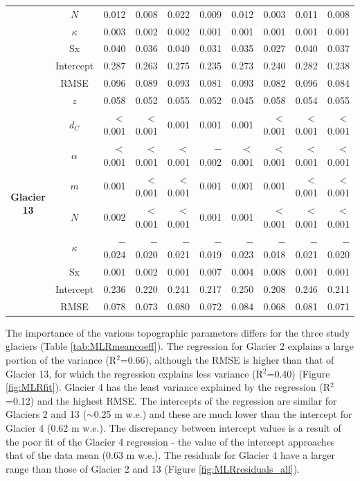 \documentclass{sfuthesis}
\begin{document}
\begin{table}
\begin{tabular}{ccrrrrrrrr}
 & $N$ & 0.012 & 0.008 & 0.022 & 0.009 & 0.012 & 0.003 & 0.011 & 0.008 \\
 & $\kappa$ & 0.003 & 0.002 & 0.002 & 0.001 & 0.001 & 0.001 & 0.001 & 0.001 \\
 & Sx & 0.040 & 0.036 & 0.040 & 0.031 & 0.035 & 0.027 & 0.040 & 0.037 \\
 & Intercept & 0.287 & 0.263 & 0.275 & 0.235 & 0.273 & 0.240 & 0.282 & 0.238 \\
 & RMSE & 0.096 & 0.089 & 0.093 & 0.081 & 0.093 & 0.082 & 0.096 & 0.084 \\ \hline
\multirow{9}{*}{\textbf{Glacier 13}} & $z$ & 0.058 & 0.052 & 0.055 & 0.052 & 0.045 & 0.058 & 0.054 & 0.055 \\
 & $d_C$ & $<$0.001 & $<$0.001 & 0.001 & 0.001 & 0.001 & $<$0.001 & $<$0.001 & $<$0.001 \\
 & $\alpha$ & $<$0.001 & $<$0.001 & $<$0.001 & $-$0.002 & $<$0.001 & $<$0.001 & $<$0.001 & $<$0.001 \\
 & $m$ & 0.001 & $<$0.001 & $<$0.001 & 0.001 & 0.001 & 0.001 & $<$0.001 & $<$0.001 \\
 & $N$ & 0.002 & $<$0.001 & $<$0.001 & 0.001 & 0.001 & $<$0.001 & $<$0.001 & $<$0.001 \\
 & $\kappa$ & $-$0.024 & $-$0.020 & $-$0.021 & $-$0.019 & $-$0.023 & $-$0.018 & $-$0.021 & $-$0.020 \\
 & Sx & 0.001 & 0.002 & 0.001 & 0.007 & 0.004 & 0.008 & 0.001 & 0.001 \\
 & Intercept & 0.236 & 0.220 & 0.241 & 0.217 & 0.250 & 0.208 & 0.246 & 0.211 \\
 & RMSE & 0.078 & 0.073 & 0.080 & 0.072 & 0.084 & 0.068 & 0.081 & 0.071
\end{tabular}
\end{table}

The importance of the various topographic parameters differs for the three study glaciers (Table \ref{tab:MLRmeancoeff}). The regression for Glacier 2 explains a large portion of the variance (R$^2$=0.66), although the RMSE is higher than that of Glacier 13, for which the regression explains less variance (R$^2$=0.40) (Figure \ref{fig:MLRfit}). Glacier 4 has the least variance explained by the regression (R$^2$=0.12) and the highest RMSE. The intercepts of the regression are similar for Glaciers 2 and 13 ($\sim$0.25 m w.e.) and these are much lower than the intercept for Glacier 4 (0.62 m w.e.). The discrepancy between intercept values is a result of the poor fit of the Glacier 4 regression - the value of the intercept approaches that of the data mean (0.63 m w.e.). The residuals for Glacier 4 have a larger range than those of Glacier 2 and 13 (Figure \ref{fig:MLRresiduals_all}).
\end{document}
